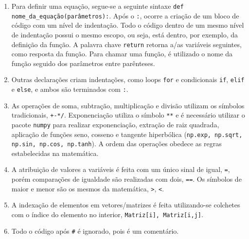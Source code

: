 \begin{apendicesenv}
	\begin{enumerate}
	\item 	Para definir uma equação, segue-se a seguinte sintaxe \texttt{def nome_da_equação(parâmetros):}. Após o \texttt{:}, ocorre a criação de um bloco de código com um nível de indentação. Todo o código dentro de um mesmo nível de indentação possui o mesmo escopo, ou seja, está dentro, por exemplo, da definição da função. A palavra chave \texttt{return} retorna a/as variáveis seguintes, como resposta da função. Para chamar uma função, é utilizado o nome da função seguido dos parâmetros entre parênteses.
	
	\item  Outras declarações criam indentações, como loops \texttt{for} e condicionais \texttt{if}, \texttt{elif} e \texttt{else}, e ambos são terminados com \texttt{:}.
	
	\item 	As operações de soma, subtração, multiplicação e divisão utilizam os símbolos tradicionais, \texttt{+-*/}. Exponenciação utiliza o símbolo \texttt{**} e é necessário utilizar o pacote \texttt{numpy} para realizar exponenciação, extração de raiz quadrada, aplicação de funções seno, cosseno e tangente hiperbólica (\texttt{np.exp, np.sqrt, np.sin, np.cos, np.tanh}). A ordem das operações obedece as regras estabelecidas na matemática. 
	
	\item 	A atribuição de valores a variáveis é feita com um único sinal de igual, \texttt{=}, porém comparações de igualdade são realizadas com dois, \texttt{==}. Os símbolos de maior e menor são os mesmos da matemática, \texttt{>}, \texttt{<}.
	
	\item 	A indexação de elementos em vetores/matrizes é feita utilizando-se colchetes com o índice do elemento no interior, \texttt{Matriz[i], Matriz[i,j]}.
	
	\item Todo o código após \texttt{#} é ignorado, pois é um comentário.
	
	\end{enumerate}


\end{apendicesenv}
